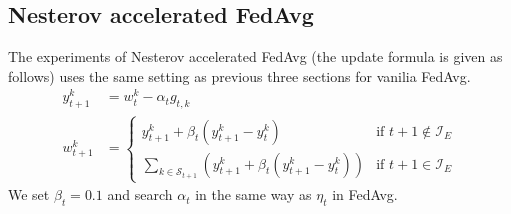 \subsection{Nesterov accelerated FedAvg}
The experiments of Nesterov accelerated FedAvg (the update formula is given as follows) uses the same setting as
previous three sections for vanilia FedAvg.
\begin{align*}
y_{t+1}^{k} & =w_{t}^{k}-\alpha_{t}g_{t,k}\\
w_{t+1}^{k} & =\begin{cases}
y_{t+1}^{k}+\beta_{t}(y_{t+1}^{k}-y_{t}^{k}) & \text{if }t+1\notin\mathcal{I}_{E}\\
\sum_{k\in\mathcal{S}_{t+1}}\left(y_{t+1}^{k}+\beta_{t}(y_{t+1}^{k}-y_{t}^{k})\right) & \text{if }t+1\in\mathcal{I}_{E}
\end{cases}
\end{align*}
We set $\beta_t = 0.1$ and search $\alpha_t$ in the same way as $\eta_t$
in FedAvg.


